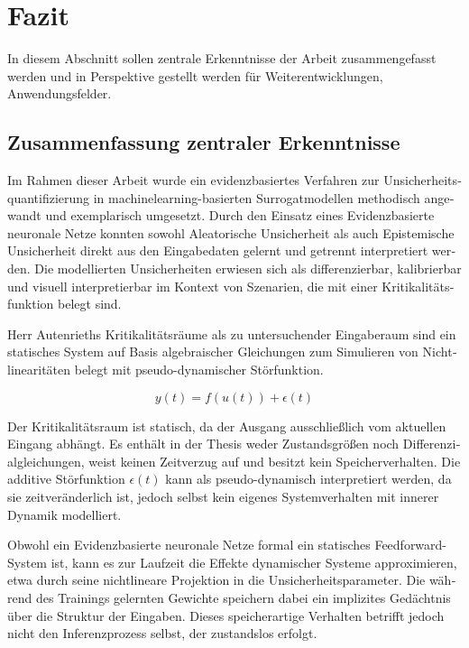 
\chapter{Fazit}\label{chapter:fazit}



\begin{otherlanguage}{american}
%
%
%
\end{otherlanguage}



\begin{otherlanguage}{ngerman}
In diesem Abschnitt sollen zentrale Erkenntnisse der Arbeit zusammengefasst werden und in Perspektive gestellt werden für Weiterentwicklungen, Anwendungsfelder.

\section{Zusammenfassung zentraler Erkenntnisse}

Im Rahmen dieser Arbeit wurde ein evidenzbasiertes Verfahren zur Unsicherheitsquantifizierung in \gls{machinelearning}-basierten Surrogatmodellen methodisch angewandt und exemplarisch umgesetzt. Durch den Einsatz eines \gls{Evidenzbasierte neuronale Netze} konnten sowohl \gls{Aleatorische Unsicherheit} als auch \gls{Epistemische Unsicherheit} direkt aus den Eingabedaten gelernt und getrennt interpretiert werden. Die modellierten Unsicherheiten erwiesen sich als differenzierbar, kalibrierbar und visuell interpretierbar im Kontext von Szenarien, die mit einer Kritikalitätsfunktion belegt sind.

Herr Autenrieths Kritikalitätsräume als zu untersuchender Eingaberaum sind ein statisches System auf Basis algebraischer Gleichungen zum Simulieren von Nichtlinearitäten belegt mit pseudo-dynamischer Störfunktion. 

\[
y(t) = f(u(t)) + \epsilon(t)
\]

Der Kritikalitätsraum ist statisch, da der Ausgang ausschließlich vom aktuellen Eingang abhängt. Es enthält in der Thesis weder Zustandsgrößen noch Differenzialgleichungen, weist keinen Zeitverzug auf und besitzt kein Speicherverhalten. Die additive Störfunktion $\epsilon(t)$ kann als pseudo-dynamisch interpretiert werden, da sie zeitveränderlich ist, jedoch selbst kein eigenes Systemverhalten mit innerer Dynamik modelliert.

Obwohl ein \gls{Evidenzbasierte neuronale Netze} formal ein statisches Feedforward-System ist, kann es zur Laufzeit die Effekte dynamischer Systeme approximieren, etwa durch seine nichtlineare Projektion in die Unsicherheitsparameter. Die während des Trainings gelernten Gewichte speichern dabei ein implizites Gedächtnis über die Struktur der Eingaben. Dieses speicherartige Verhalten betrifft jedoch nicht den Inferenzprozess selbst, der zustandslos erfolgt.


\end{otherlanguage}
